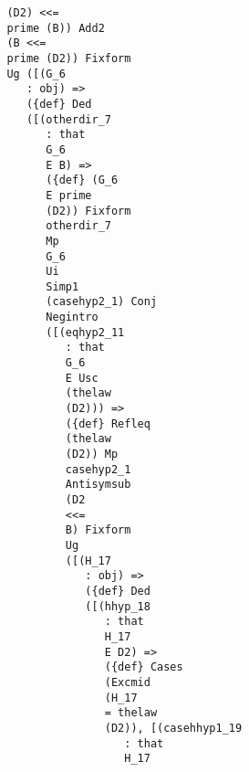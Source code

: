 \documentclass[12pt]{article}
\begin{document}
\begin{verbatim}
                                  (D2) <<= 
                                  prime (B)) Add2 
                                  (B <<= 
                                  prime (D2)) Fixform 
                                  Ug ([(G_6 
                                     : obj) => 
                                     ({def} Ded 
                                     ([(otherdir_7 
                                        : that 
                                        G_6 
                                        E B) => 
                                        ({def} (G_6 
                                        E prime 
                                        (D2)) Fixform 
                                        otherdir_7 
                                        Mp 
                                        G_6 
                                        Ui 
                                        Simp1 
                                        (casehyp2_1) Conj 
                                        Negintro 
                                        ([(eqhyp2_11 
                                           : that 
                                           G_6 
                                           E Usc 
                                           (thelaw 
                                           (D2))) => 
                                           ({def} Refleq 
                                           (thelaw 
                                           (D2)) Mp 
                                           casehyp2_1 
                                           Antisymsub 
                                           (D2 
                                           <<= 
                                           B) Fixform 
                                           Ug 
                                           ([(H_17 
                                              : obj) => 
                                              ({def} Ded 
                                              ([(hhyp_18 
                                                 : that 
                                                 H_17 
                                                 E D2) => 
                                                 ({def} Cases 
                                                 (Excmid 
                                                 (H_17 
                                                 = thelaw 
                                                 (D2)), [(casehhyp1_19 
                                                    : that 
                                                    H_17 

\end{verbatim}
\end{document}
